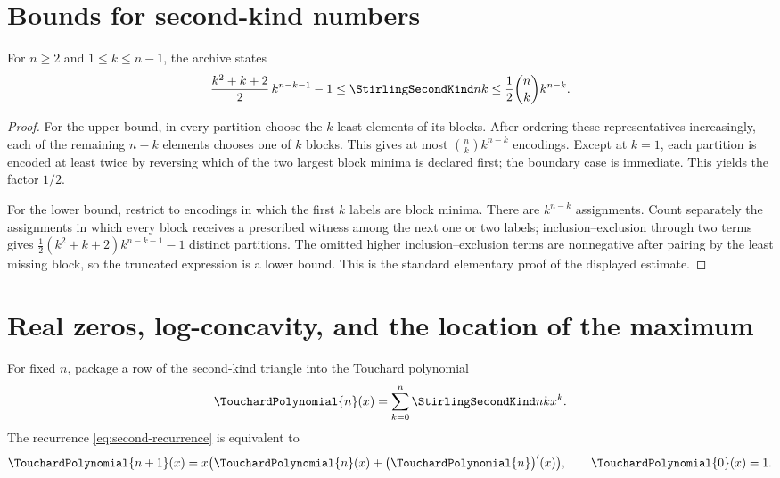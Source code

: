 \documentclass[11pt,a4paper,oneside,openany]{book}
\theoremstyle{definition}
\theoremstyle{remark}
\begin{document}
\section{Bounds for second-kind numbers}
For $n\ge2$ and $1\le k\le n-1$, the archive states
\begin{equation}\label{eq:second-bounds}
 \frac{k^2+k+2}{2}\,k^{n-k-1}-1
 \le\StirlingSecondKind nk
 \le\frac12\binom nk k^{n-k}.
\end{equation}
\begin{proof}
For the upper bound, in every partition choose the $k$ least elements of its blocks.
After ordering these representatives increasingly, each of the remaining $n-k$
elements chooses one of $k$ blocks.  This gives at most $\binom nk k^{n-k}$ encodings.
Except at $k=1$, each partition is encoded at least twice by reversing which of the
two largest block minima is declared first; the boundary case is immediate.  This
yields the factor $1/2$.

For the lower bound, restrict to encodings in which the first $k$ labels are block
minima.  There are $k^{n-k}$ assignments.  Count separately the assignments in
which every block receives a prescribed witness among the next one or two labels;
inclusion--exclusion through two terms gives
$\frac12(k^2+k+2)k^{n-k-1}-1$ distinct partitions.  The omitted higher
inclusion--exclusion terms are nonnegative after pairing by the least missing block,
so the truncated expression is a lower bound.  This is the standard elementary
proof of the displayed estimate.
\end{proof}


\section{Real zeros, log-concavity, and the location of the maximum}
For fixed $n$, package a row of the second-kind triangle into the Touchard
polynomial
\[
 \TouchardPolynomial{n}(x)=\sum_{k=0}^{n}\StirlingSecondKind nk x^k.
\]
The recurrence \eqref{eq:second-recurrence} is equivalent to
\begin{equation}
\label{eq:touchard-differential-recurrence-shape}
 \TouchardPolynomial{n+1}(x)=x\bigl(\TouchardPolynomial{n}(x)+\bigl(\TouchardPolynomial{n}\bigr)'(x)\bigr),
 \qquad \TouchardPolynomial{0}(x)=1.
\end{equation}
\end{document}

